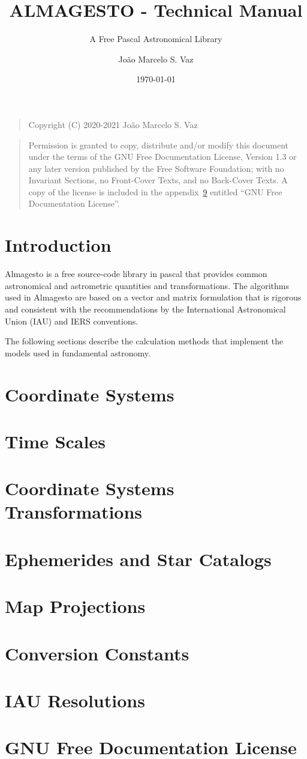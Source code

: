 \documentclass[a4paper,11pt]{scrreport}
\title{ALMAGESTO - Technical Manual}
\subtitle{A Free Pascal Astronomical Library}
\author{João Marcelo S. Vaz}
\date{\today}
\begin{document}
\maketitle
{}
\begin{quote}    
Copyright (C) 2020-2021 João Marcelo S. Vaz
\end{quote}
\begin{quote} 
Permission is granted to copy, distribute and/or modify this document under the terms of the GNU Free Documentation License, Version 1.3 or any later version published by the Free Software Foundation; with no Invariant Sections, no Front-Cover Texts, and no Back-Cover Texts. A copy of the license is included in the appendix~\ref{License} entitled ``GNU Free Documentation License''.
\end{quote}
	
\tableofcontents

	
	
	
\clearpage
{}
\chapter{Introduction}

Almagesto is a free source-code library in pascal that provides common astronomical and astrometric quantities and transformations. The algorithms used in Almagesto are based on a vector and matrix formulation that is rigorous and consistent with the recommendations by the International Astronomical Union (IAU) and IERS conventions.

The following sections describe the calculation methods that implement the models used in fundamental astronomy.

\chapter{Coordinate Systems}
\chapter{Time Scales}
\chapter{Coordinate Systems Transformations}
\chapter{Ephemerides and Star Catalogs}
\chapter{Map Projections}


\appendix
\chapter{Conversion Constants}

\chapter{IAU Resolutions}
	
\chapter{GNU Free Documentation License}\label{License}




\end{document}
